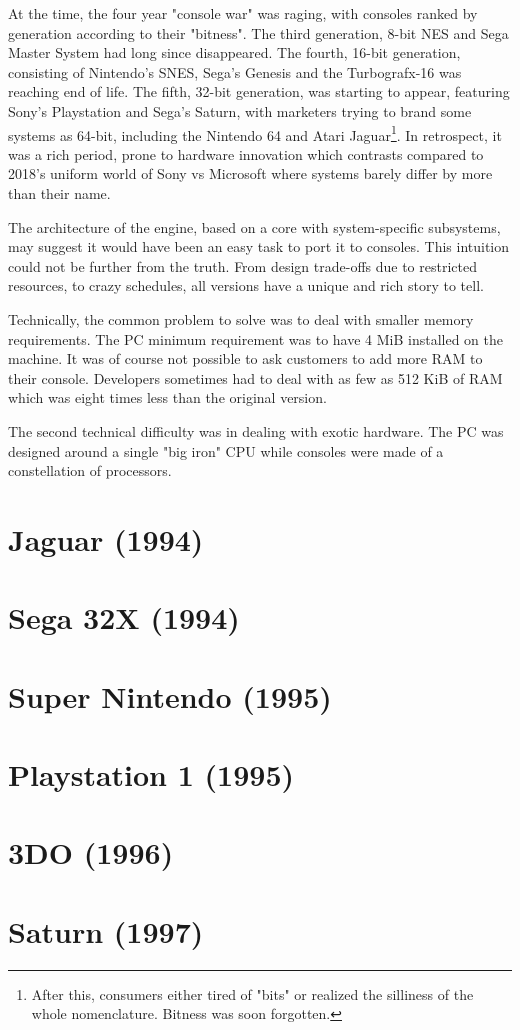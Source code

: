 At the time, the four year "console war" was raging, with consoles ranked by generation according to their "bitness". The third generation, 8-bit NES and Sega Master System had long since disappeared. The fourth, 16-bit generation, consisting of Nintendo's SNES, Sega's Genesis and the Turbografx-16 was reaching end of life. The fifth, 32-bit generation, was starting to appear, featuring Sony's Playstation and Sega's Saturn, with marketers trying to brand some systems as 64-bit, including the Nintendo 64 and Atari Jaguar\footnote{After this, consumers either tired of "bits" or realized the silliness of the whole nomenclature. Bitness was soon forgotten.}. In retrospect, it was a rich period, prone to hardware innovation which contrasts compared to 2018's uniform world of Sony vs Microsoft where systems barely differ by more than their name.\\
\par
The architecture of the \doom{} engine, based on a core with system-specific subsystems, may suggest it would have been an easy task to port it to consoles. This intuition could not be further from the truth. From design trade-offs due to restricted resources, to crazy schedules, all versions have a unique and rich story to tell.\\
\par
Technically, the common problem to solve was to deal with smaller memory requirements. The PC minimum requirement was to have 4 MiB installed on the machine. It was of course not possible to ask customers to add more RAM to their console. Developers sometimes had to deal with as few as 512 KiB of RAM which was eight times less than the original version.\\
\par
The second technical difficulty was in dealing with exotic hardware. The PC was designed around a single "big iron" CPU while consoles were made of a constellation of processors.


\section{Jaguar (1994)}
 

\section{Sega 32X (1994)}
 

\section{Super Nintendo (1995)}


\section{Playstation 1 (1995)}


\section{3DO (1996)}


\section{Saturn (1997)}


